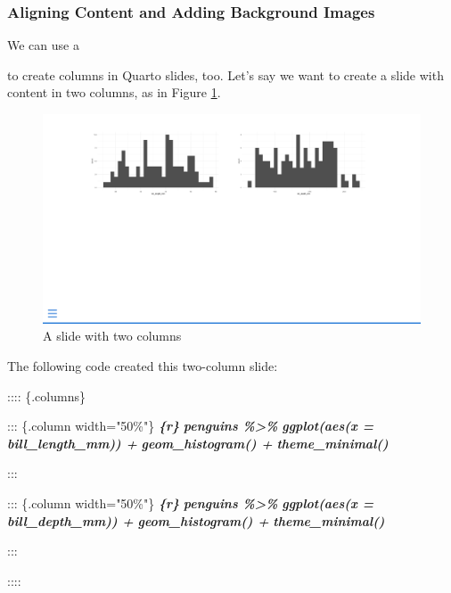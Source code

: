 \documentclass[
]{book}
\newenvironment{Shaded}{\begin{snugshade}}{\end{snugshade}}
\newcommand{\InformationTok}[1]{\textcolor[rgb]{0.56,0.35,0.01}{\textbf{\textit{#1}}}}
\newcommand{\NormalTok}[1]{#1}
\begin{document}
\hypertarget{aligning-content-and-adding-background-images}{%
\subsubsection*{Aligning Content and Adding Background Images}\label{aligning-content-and-adding-background-images}}

We can use a

to create columns in Quarto slides, too. Let's say we want to create a slide with content in two columns, as in Figure \ref{fig:quarto-slides-two-columns}.

\begin{figure}
\includegraphics[width=1\linewidth]{assets/quarto-slides-two-columns} \caption{A slide with two columns}\label{fig:quarto-slides-two-columns}
\end{figure}

The following code created this two-column slide:

\begin{Shaded}
\begin{Highlighting}[]
\NormalTok{:::: \{.columns\}}

\NormalTok{::: \{.column width="50\%"\}}
\InformationTok{\textasciigrave{}\textasciigrave{}\textasciigrave{}\{r\}}
\InformationTok{penguins \%\textgreater{}\%}
\InformationTok{  ggplot(aes(x = bill\_length\_mm)) +}
\InformationTok{  geom\_histogram() +}
\InformationTok{  theme\_minimal()}
\InformationTok{\textasciigrave{}\textasciigrave{}\textasciigrave{}}

\NormalTok{:::}

\NormalTok{::: \{.column width="50\%"\}}
\InformationTok{\textasciigrave{}\textasciigrave{}\textasciigrave{}\{r\}}
\InformationTok{penguins \%\textgreater{}\%}
\InformationTok{  ggplot(aes(x = bill\_depth\_mm)) +}
\InformationTok{  geom\_histogram() +}
\InformationTok{  theme\_minimal()}
\InformationTok{\textasciigrave{}\textasciigrave{}\textasciigrave{}}

\NormalTok{:::}

\NormalTok{::::}
\end{Highlighting}
\end{Shaded}
\end{document}
